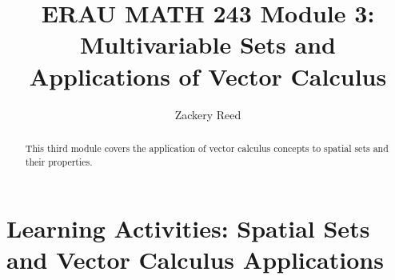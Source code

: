 \documentclass{xourse}
\title{ERAU MATH 243 Module 3: Multivariable Sets and Applications of Vector Calculus}
\author{Zackery Reed}
\begin{document}
\begin{abstract}
This third module covers the application of vector calculus concepts to spatial sets and their properties.
\end{abstract}
\maketitle

\part{Learning Activities: Spatial Sets and Vector Calculus Applications}
\sectionstyle


\end{document}
